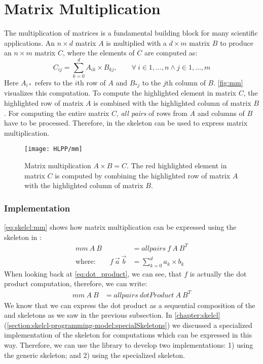 \section{Matrix Multiplication}

The multiplication of matrices is a fundamental building block for many scientific applications.
An $n\times d$ matrix $A$ is multiplied with a $d\times m$ matrix $B$ to produce an $n\times m$ matrix $C$, where the elements of $C$ are computed as:
\begin{equation*}
  C_{ij} = \sum_{k=0}^{d} A_{ik} \times B_{kj}, \qquad \forall\ i \in 1, \ldots, n \wedge j \in 1, \ldots, m
\end{equation*}
Here $A_{i*}$ refers to the $i$th row of $A$ and $B_{*j}$ to the $j$th column of $B$.
\autoref{fig:mm} visualizes this computation.
To compute the highlighted element in matrix $C$, the highlighted row of matrix $A$ is combined with the highlighted column of matrix $B$.
For computing the entire matrix $C$, \emph{all pairs} of rows from $A$ and columns of $B$ have to be processed.
Therefore, in \SkelCL the \allpairs skeleton can be used to express matrix multiplication.

\begin{figure}[tb]
  \centering
  \texttt{[image: HLPP/mm]}
  \caption[Visalization of matrix multiplication.]%
          {Matrix multiplication $A\times B = C$.
           The red highlighted element in matrix $C$ is computed by combining the highlighted row of matrix $A$ with the highlighted column of matrix $B$.}
  \label{fig:mm}
\end{figure}


\subsubsection*{\SkelCL Implementation}
\autoref{eq:skelcl:mm} shows how matrix multiplication can be expressed using the \allpairs skeleton in \SkelCL:
\begin{align}
  \label{eq:skelcl:mm}
  mm\ A\ B &= allpairs\ f\ A\ B^T\\
  \text{where:} \qquad f\ \vec{a}\ \vec{b} &= \sum_{k=0}^d a_k \times b_k \nonumber
\end{align}
When looking back at \autoref{eq:dot_product}, we can see, that $f$ is actually the dot product computation, therefore, we can write:
\begin{align}
  mm\ A\ B &= allpairs\ dotProduct\ A\ B^T
  \label{eq:skelcl:mm:dot}
\end{align}
We know that we can express the dot product as a sequential composition of the \zip and \reduce skeletons as we saw in the previous subsection.
In \autoref{chapter:skelcl} (\autoref{section:skelcl-programming-model:specialSkeletons}) we discussed a specialized implementation of the \allpairs skeleton for computations which can be expressed in this way.
Therefore, we can use the \SkelCL library to develop two implementations:
1) using the generic \allpairs skeleton; and 2) using the specialized \allpairs skeleton.

